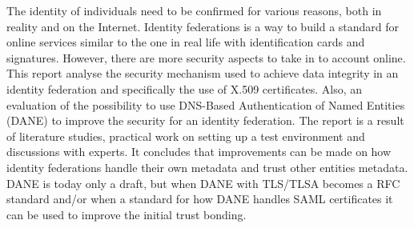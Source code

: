 The identity of individuals need to be confirmed for various reasons, both in reality and on the Internet. 
Identity federations is a way to build a standard for online services similar to the one in real life with identification cards and signatures.
However, there are more security aspects to take in to account online.
This report analyse the security mechanism used to achieve data integrity in an identity federation and specifically the use of X.509 certificates.
Also, an evaluation of the possibility to use DNS-Based Authentication of Named Entities (DANE) to improve the security for an identity federation.
The report is a result of literature studies, practical work on setting up a test environment and discussions with experts.
It concludes that improvements can be made on how identity federations handle their own metadata and trust other entities metadata. 
DANE is today only a draft, but when DANE with TLS/TLSA becomes a RFC standard and/or when a standard for how DANE handles SAML certificates it can be used to improve the initial trust bonding.






